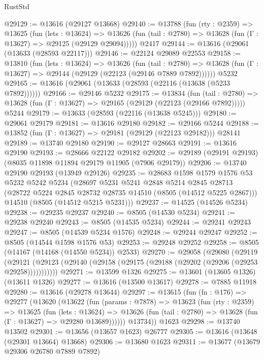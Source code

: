 \begin{lexlean}{RustStd}
\begin{coremodule}
@29129 := @13616 (@29127 @13668)
@29140 := @13788
    (fun (rty : @2359) =>
    @13625
      (fun (lets : @13624) =>
      @13626 (fun (tail : @2780) => @13628 (fun (Γ : @13627) => @29125 (@29129 @29094)))))
    @2417
@29144 := @13616 (@29061 (@13633 (@28593 @22117)))
@29146 := @22124 @29089 @22553
@29158 := @13810
    (fun (lets : @13624) =>
    @13626
      (fun (tail : @2780) =>
      @13628 (fun (Γ : @13627) => @29144 (@29129 (@22123 (@29146 @7889 @7892))))))
    @5232
@29165 := @13616 (@29061 (@13633 (@28593 (@22116 (@13638 (@5233 @7892))))))
@29166 := @29146 @5232
@29175 := @13834
    (fun (tail : @2780) => @13628 (fun (Γ : @13627) => @29165 (@29129 (@22123 (@29166 @7892)))))
    @5244
@29179 := @13633 (@28593 (@22116 (@13638 @5245)))
@29180 := @29061 @29179
@29181 := @13616 @29180
@29182 := @29166 @5244
@29188 := @13852 (fun (Γ : @13627) => @29181 (@29129 (@22123 @29182))) @28141
@29189 := @13740 @29180
@29190 := @29127 @28663
@29191 := @13616 @29190
@29193 := @28666 @22122 @29182
@29202 := @29189 (@29191 @29193) (@8035 @11898 @11894 @29179 @11905 (@7906 @29179))
@29206 := @13740 @29190 @29193 (@13949 @29126)
@29235 := @28683
    @1598
    @1579
    @1576
    @53
    @5232
    @5242
    @5234
    (@28697
      @5231
      @5241
      @2848
      @5214
      @2845
      @28713
      (@28722 @5224 @2845 @28732 @28735 @14510 (@8505 (@14512 @5225 @2867)))
      @14510
      (@8505 (@14512 @5215 @5231)))
@29237 := @14525 (@14526 @5234)
@29238 := @29235 @29237
@29240 := @8505 (@14530 @5234)
@29241 := @29238 @29240
@29243 := @8505 (@14535 @5234)
@29244 := @29241 @29243
@29247 := @8505 (@14539 @5234 @1576)
@29248 := @29244 @29247
@29252 := @8505 (@14544 @1598 @1576 @53)
@29253 := @29248 @29252
@29258 := @8505 (@14167 (@14168 (@14550 @5234)) @2533)
@29270 := @29058
    (@29080
      (@29119
        (@29121 (@29123 (@29140 (@29158 (@29175 (@29188 (@29202 (@29206 (@29253 @29258)))))))))))
@29271 := @13599 @1326
@29275 := @13601 (@13605 @1326) (@13611 @1326)
@29277 := @13616 (@13500 @13617)
@29278 := @7885 @11918
@29280 := @13616 (@29278 @13644)
@29297 := @13615
    (fun (fn : @176) =>
    @29277
      (@13620
        (@13622
          (fun (params : @7878) =>
          @13623
            (fun (rty : @2359) =>
            @13625
              (fun (lets : @13624) =>
              @13626 (fun (tail : @2780) => @13628 (fun (Γ : @13627) => @29280 @13689))))))
        @13734))
    @1623
@29298 := @13740 @13502
@29301 := @13656 (@13657 @1623) @26777
@29305 := @13616 (@13648 (@29301 @13664) @13668)
@29306 := @13680 @1623
@29311 := @13677 (@13679 @29306 @26780 @7889 @7892)

\end{coremodule}
\end{lexlean}
